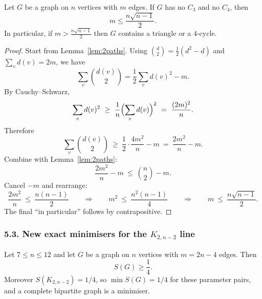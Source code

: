 \begin{lemma}\label{lem:edges-girth5}
Let $G$ be a graph on $n$ vertices with $m$ edges. If $G$ has no $C_3$ and no $C_4$, then
\[m\le \frac{n\sqrt{n-1}}{2}.
\]
In particular, if $m>\frac{n\sqrt{n-1}}{2}$ then $G$ contains a triangle or a $4$-cycle.
\end{lemma}

\begin{proof}
Start from Lemma~\ref{lem:2paths}.
Using $\binom{d}{2}=\frac12(d^2-d)$ and $\sum_v d(v)=2m$, we have
\[
\sum_v\binom{d(v)}{2}=\frac12\sum_v d(v)^2-m.
\]
By Cauchy--Schwarz,
\[\sum_v d(v)^2\ \ge\ \frac1n\Bigl(\sum_v d(v)\Bigr)^2\ =\ \frac{(2m)^2}{n}.
\]
Therefore
\[
\sum_v\binom{d(v)}{2}\ \ge\ \frac12\cdot\frac{4m^2}{n}-m\ =\ \frac{2m^2}{n}-m.
\]
Combine with Lemma~\ref{lem:2paths}:
\[
\frac{2m^2}{n}-m\ \le\ \binom{n}{2}-m.
\]
Cancel $-m$ and rearrange:
\[
\frac{2m^2}{n}\ \le\ \frac{n(n-1)}{2}
\qquad\Longrightarrow\qquad
m^2\ \le\ \frac{n^2(n-1)}{4}
\qquad\Longrightarrow\qquad
m\ \le\ \frac{n\sqrt{n-1}}{2}.
\]
The final ``in particular'' follows by contrapositive.
\end{proof}

\subsubsection*{5.3. New exact minimisers for the $K_{2,n-2}$ line}

\begin{proposition}[Exact minimisation for $(n,m)=(n,2n-4)$ up to $n=12$]\label{prop:2n-4}
Let $7\le n\le 12$ and let $G$ be a graph on $n$ vertices with $m=2n-4$ edges.
Then
\[S(G)\ge \frac14.
\]
Moreover $S(K_{2,n-2})=1/4$, so $\min S(G)=1/4$ for these parameter pairs, and a complete bipartite graph is a minimiser.
\end{proposition}

